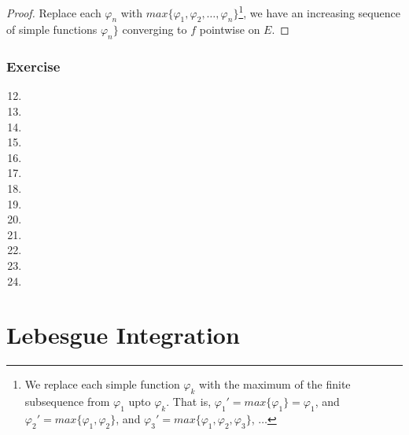 \begin{proof}
	Replace each $\varphi_n$ with $max\{ \varphi_1,\varphi_2,\dots,\varphi_n\}$\dag\footnote{
		We replace each simple function $\varphi_k$ with the maximum of the finite subsequence from $\varphi_1$ upto $\varphi_k$.
		That is,
		$\varphi_1' = max \{ \varphi_1 \} = \varphi_1$, and
		$\varphi_2' = max \{ \varphi_1,\varphi_2 \}$, and
		$\varphi_3' = max \{ \varphi_1,\varphi_2,\varphi_3 \}$, $\dots$
		},
	we have an increasing sequence of simple functions $\varphi_n \}$ converging to $f$ pointwise on $E$.
\end{proof}
\subsubsection{Exercise}
\begin{enumerate}
	\setcounter{enumi}{11}
	\item
	\item
	\item
	\item
	\item
	\item
	\item
	\item
	\item
	\item
	\item
	\item
	\item
\end{enumerate}


\section{Lebesgue Integration}

